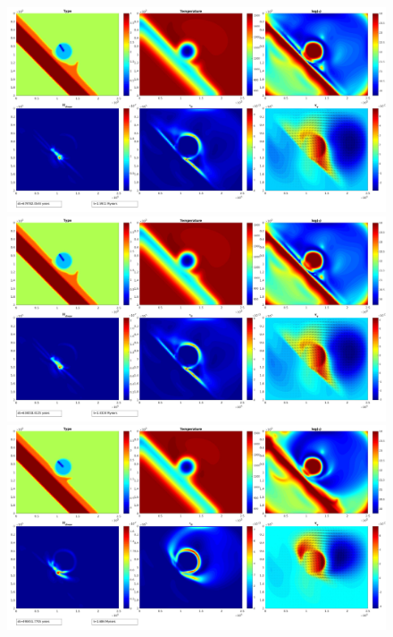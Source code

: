 \documentclass[12pt]{scrreprt}
\begin{document}
\begin{figure}[!ht]
	\begin{minipage}[t]{1.0\textwidth}
		\begin{minipage}[t]{0.5\textwidth}
			\includegraphics[width=1.0\textwidth]{./Snapshots/bulldozer/posleft45/Subductionzonewithblob67posleftslab45s1e8s1e6r20.jpg}
		\end{minipage}
		\begin{minipage}[t]{0.5\textwidth}
			\includegraphics[width=1.0\textwidth]{./Snapshots/bulldozer/posleft45/Subductionzonewithblob67posleftslab45s5e7s1e6r20.jpg}
		\end{minipage}
	\end{minipage}
	\begin{minipage}[c]{1.0\textwidth}
		\begin{minipage}[t]{0.5\textwidth}
			\includegraphics[width=1.0\textwidth]{./Snapshots/bulldozer/posleft45/Subductionzonewithblob72posleftslab45s5e7s1e7r20.jpg}

\end{minipage}
\end{minipage}
\end{figure}
\end{document}
